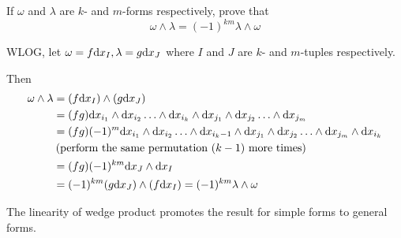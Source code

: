 \documentclass[a4paper, 12pt]{article}
\begin{document}
\begin{problem} 
If $\omega$ and $\lambda$ are $k$- and $m$-forms respectively, prove that \[
\omega \wedge \lambda = (-1)^{km} \lambda \wedge \omega
\]
\end{problem}
\begin{solution}
    WLOG, let $\omega = f \mathrm{d} x_I, \lambda = g \mathrm{d} x_J$ where $I$ and $J$ are $k$- and $m$-tuples respectively.

    Then \begin{align*}
        \omega \wedge \lambda &= (f \mathrm{d} x_I) \wedge (g \mathrm{d} x_J) \\
        &= (fg) \mathrm{d} x_{i_1} \wedge \mathrm{d} x_{i_2} \ldots \wedge \mathrm{d} x_{i_k} \wedge \mathrm{d} x_{j_1} \wedge \mathrm{d} x_{j_2} \ldots \wedge \mathrm{d} x_{j_m} \\
        &= (fg) (-1)^m \mathrm{d} x_{i_1} \wedge \mathrm{d} x_{i_2} \ldots \wedge \mathrm{d} x_{i_k-1} \wedge \mathrm{d} x_{j_1} \wedge \mathrm{d} x_{j_2} \ldots \wedge \mathrm{d} x_{j_m} \wedge \mathrm{d} x_{i_k} \\
        & \:\text{(perform the same permutation $(k-1)$ more times)}\: \\
        &= (fg)(-1)^{km} \mathrm{d} x_J \wedge \mathrm{d} x_I\\
        &= (-1)^{km} (g \mathrm{d} x_J) \wedge (f \mathrm{d} x_I) = (-1)^{km} \lambda \wedge \omega
    \end{align*}

    The linearity of wedge product promotes the result for simple forms to general forms.
\end{solution}
\end{document}
